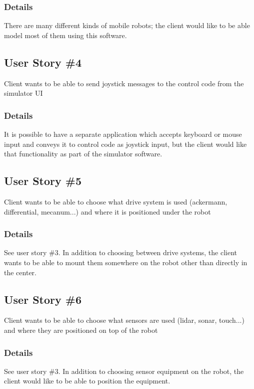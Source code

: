 \subsubsection*{Details}
There are many different kinds of mobile robots; the client would like to be able model most of them using this software.

\subsection{User Story \#4\label{us:4}} 
Client wants to be able to send joystick messages to the control code from the simulator UI

\subsubsection*{Details}
It is possible to have a separate application which accepts keyboard or mouse input and conveys it to control code as joystick input, but the client would like that functionality as part of the simulator software.

\subsection{User Story \#5\label{us:5}}
Client wants to be able to choose what drive system is used (ackermann, differential, mecanum...) and where it is positioned under the robot

\subsubsection*{Details}
See user story \#3. In addition to choosing between drive systems, the client wants to be able to mount them somewhere on the robot other than directly in the center.

\subsection{User Story \#6\label{us:6}} 
Client wants to be able to choose what sensors are used (lidar, sonar, touch...) and where they are positioned on top of the robot

\subsubsection*{Details}
See user story \#3. In addition to choosing sensor equipment on the robot, the client would like to be able to position the equipment.

